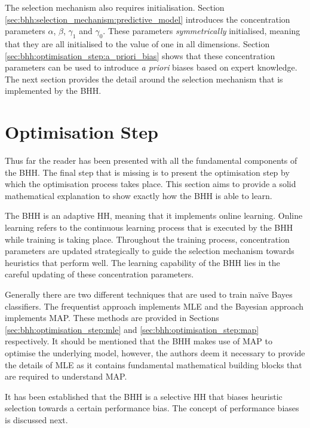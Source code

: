 The selection mechanism also requires initialisation. Section \ref{sec:bhh:selection_mechanism:predictive_model} introduces the concentration parameters $\alpha$, $\beta$, $\gamma_{1}$ and $\gamma_{0}$. These parameters \textit{symmetrically} initialised, meaning that they are all initialised to the value of one in all dimensions. Section \ref{sec:bhh:optimisation_step:a_priori_bias} shows that these concentration parameters can be used to introduce \textit{a priori} biases based on expert knowledge. The next section provides the detail around the selection mechanism that is implemented by the \ac{BHH}.


\section{Optimisation Step}
\label{sec:bhh:optimisation_step}

Thus far the reader has been presented with all the fundamental components of the \ac{BHH}. The final step that is missing is to present the optimisation step by which the optimisation process takes place. This section aims to provide a solid  mathematical explanation to show exactly how the \ac{BHH} is able to learn.

The \ac{BHH} is an adaptive \ac{HH}, meaning that it implements online learning. Online learning refers to the continuous learning process that is executed by the \ac{BHH} while training is taking place. Throughout the training process, concentration parameters are updated strategically to guide the selection mechanism towards heuristics that perform well. The learning capability of the \ac{BHH} lies in the careful updating of these concentration parameters.

Generally there are two different techniques that are used to train naïve Bayes classifiers. The frequentist approach implements \ac{MLE} and the Bayesian approach implements \ac{MAP}. These methods are provided in Sections \ref{sec:bhh:optimisation_step:mle} and \ref{sec:bhh:optimisation_step:map} respectively. It should be mentioned that the \ac{BHH} makes use of \ac{MAP} to optimise the underlying model, however, the authors deem it necessary to provide the details of \ac{MLE} as it contains fundamental mathematical building blocks that are required to understand \ac{MAP}.

It has been established that the \ac{BHH} is a selective \ac{HH} that biases heuristic selection towards a certain performance bias. The concept of performance biases is discussed next.

